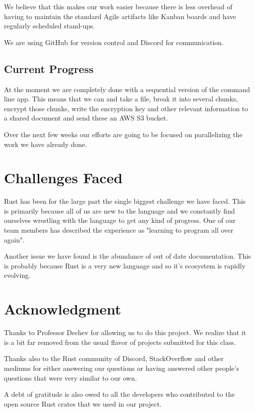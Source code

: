 \documentclass[conference]{IEEEtran}
\begin{document}
We believe that this makes our work easier because there is less overhead of having
to maintain the standard Agile artifacts like Kanban boards and have regularly scheduled stand-ups.

We are using GitHub for version control and Discord for communication.

\subsection{Current Progress}

At the moment we are completely done with a sequential version of the command line app.
This means that we can and take a file, break it into several chunks, encrypt those chunks,
write the encryption key and other relevant information to a shared document and send these
an AWS S3 bucket.

Over the next few weeks our efforts are going to be focused on parallelizing the work we have
already done.

\section{Challenges Faced}

Rust has been for the large part the single biggest challenge we have faced.
This is primarily because all of us are new to the language and we constantly find ourselves
wrestling with the language to get any kind of progress.
One of our team members has described the experience as "learning to program all over again".

Another issue we have found is the abundance of out of date documentation.
This is probably because Rust is a very new language and so it's ecosystem is rapidly evolving.

\section*{Acknowledgment}

Thanks to Professor Dechev for allowing us to do this project.
We realize that it is a bit far removed from the usual flavor
of projects submitted for this class.

Thanks also to the Rust community of Discord, StackOverflow
and other mediums for either answering our questions or having
answered other people's questions that were very similar to our own.

A debt of gratitude is also owed to all the developers who contributed
to the open source Rust crates that we used in our project.
\end{document}

